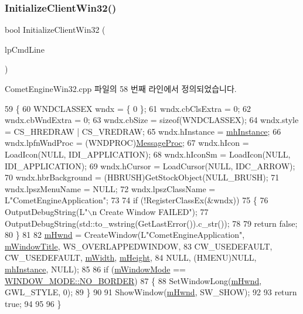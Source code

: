 \subsubsection{\texorpdfstring{Initialize\+Client\+Win32()}{InitializeClientWin32()}}
{\footnotesize\ttfamily bool Initialize\+Client\+Win32 (\begin{DoxyParamCaption}\item[{L\+P\+S\+TR}]{lp\+Cmd\+Line }\end{DoxyParamCaption})\hspace{0.3cm}{\ttfamily [private]}}



Comet\+Engine\+Win32.\+cpp 파일의 58 번째 라인에서 정의되었습니다.


\begin{DoxyCode}
59 \{
60     WNDCLASSEX wndx = \{ 0 \};
61     wndx.cbClsExtra = 0;
62     wndx.cbWndExtra = 0;
63     wndx.cbSize = \textcolor{keyword}{sizeof}(WNDCLASSEX);
64     wndx.style = CS\_HREDRAW | CS\_VREDRAW;
65     wndx.hInstance = \hyperlink{class_comet_engine_1_1_comet_engine_win32_a699a17c72a7b5416a8966df051f9c752}{mhInstance};
66     wndx.lpfnWndProc = (WNDPROC)\hyperlink{class_comet_engine_1_1_comet_engine_win32_a69f7f5121282027943c96964bb85ef85}{MessageProc};
67     wndx.hIcon = LoadIcon(NULL, IDI\_APPLICATION);
68     wndx.hIconSm = LoadIcon(NULL, IDI\_APPLICATION);
69     wndx.hCursor = LoadCursor(NULL, IDC\_ARROW);
70     wndx.hbrBackground = (HBRUSH)GetStockObject(NULL\_BRUSH);
71     wndx.lpszMenuName = NULL;
72     wndx.lpszClassName = L\textcolor{stringliteral}{"CometEngineApplication"};
73 
74     \textcolor{keywordflow}{if} (!RegisterClassEx(&wndx))
75     \{
76         OutputDebugString(L\textcolor{stringliteral}{"\(\backslash\)n Create Window FAILED"});
77         OutputDebugString(std::to\_wstring(GetLastError()).c\_str());
78 
79         \textcolor{keywordflow}{return} \textcolor{keyword}{false};
80     \}
81 
82      \hyperlink{class_comet_engine_1_1_comet_engine_win32_a31c6576456c4bfea9672c5198aa18460}{mHwnd} = CreateWindow(L\textcolor{stringliteral}{"CometEngineApplication"}, \hyperlink{class_comet_engine_1_1_comet_engine_win32_a63ee29dd5d917889a0e7b644fea26d06}{mWindowTitle}, WS\_OVERLAPPEDWINDOW,
83         CW\_USEDEFAULT, CW\_USEDEFAULT, \hyperlink{class_comet_engine_1_1_comet_engine_win32_a954be7feb8f6558f86a08a30d640013e}{mWidth}, \hyperlink{class_comet_engine_1_1_comet_engine_win32_ae5ce9d2610ee7e9675a4ecc74b0c9492}{mHeight},
84         NULL, (HMENU)NULL, \hyperlink{class_comet_engine_1_1_comet_engine_win32_a699a17c72a7b5416a8966df051f9c752}{mhInstance}, NULL);
85 
86     \textcolor{keywordflow}{if} (\hyperlink{class_comet_engine_1_1_comet_engine_win32_a31fa5cdc3ed0a81919f9ae7ec61844d1}{mWindowMode} == \hyperlink{namespace_comet_engine_abdc5ec13bf1dfb1d26eb0bcc9da0ddada2fcf3c9ce3f39ff118fc4e667c4e2cc6}{WINDOW\_MODE::NO\_BORDER})
87     \{
88         SetWindowLong(\hyperlink{class_comet_engine_1_1_comet_engine_win32_a31c6576456c4bfea9672c5198aa18460}{mHwnd}, GWL\_STYLE, 0);
89     \}
90 
91     ShowWindow(\hyperlink{class_comet_engine_1_1_comet_engine_win32_a31c6576456c4bfea9672c5198aa18460}{mHwnd}, SW\_SHOW);
92 
93     \textcolor{keywordflow}{return} \textcolor{keyword}{true};
94 
95     
96 \}
\end{DoxyCode}
